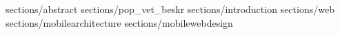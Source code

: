 \documentclass{article}
\begin{document}
	

	 {sections/abstract}
	 {sections/pop_vet_beskr}
		\tableofcontents
	 {sections/introduction}
	 {sections/web}
	 {sections/mobilearchitecture}
	 {sections/mobilewebdesign}
	
	
	
	
\end{document}
